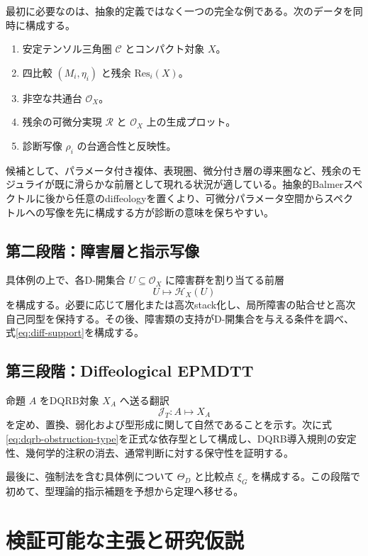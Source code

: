 \documentclass[a4paper,11pt]{ltjsarticle}
\theoremstyle{definition}
\theoremstyle{plain}
\newcommand{\Res}{\mathrm{Res}}
\begin{document}
最初に必要なのは、抽象的定義ではなく一つの完全な例である。次のデータを同時に構成する。
\begin{enumerate}
 \item 安定テンソル三角圏 $\mathcal C$ とコンパクト対象 $X$。
 \item 四比較 $(M_i,\eta_i)$ と残余 $\Res_i(X)$。
 \item 非空な共通台 $\mathcal O_X$。
 \item 残余の可微分実現 $\mathcal R$ と $\mathcal O_X$ 上の生成プロット。
 \item 診断写像 $\rho_i$ の台適合性と反映性。
\end{enumerate}

候補として、パラメータ付き複体、表現圏、微分付き層の導来圏など、残余のモジュライが既に滑らかな前層として現れる状況が適している。抽象的Balmerスペクトルに後から任意のdiffeologyを置くより、可微分パラメータ空間からスペクトルへの写像を先に構成する方が診断の意味を保ちやすい。

\subsection{第二段階：障害層と指示写像}

具体例の上で、各D-開集合 $U\subseteq\mathcal O_X$ に障害群を割り当てる前層
\begin{equation}
 U\longmapsto\mathcal H_X(U)
 \end{equation}
を構成する。必要に応じて層化または高次stack化し、局所障害の貼合せと高次自己同型を保持する。その後、障害類の支持がD-開集合を与える条件を調べ、式\eqref{eq:diff-support}を構成する。

\subsection{第三段階：Diffeological EPMDTT}

命題 $A$ をDQRB対象 $X_A$ へ送る翻訳
\begin{equation}
 \mathcal J_T:A\longmapsto X_A
 \end{equation}
を定め、置換、弱化および型形成に関して自然であることを示す。次に式\eqref{eq:dqrb-obstruction-type}を正式な依存型として構成し、DQRB導入規則の安定性、幾何学的注釈の消去、通常判断に対する保守性を証明する。

最後に、強制法を含む具体例について $\Theta_D$ と比較点 $\xi_G$ を構成する。この段階で初めて、型理論的指示補題を予想から定理へ移せる。

\section{検証可能な主張と研究仮説}
\end{document}
